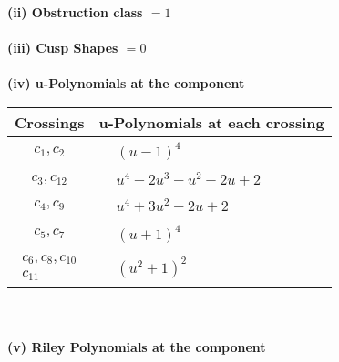 \documentclass[1p]{elsarticle_modified}
\theoremstyle{definition}
\begin{document}
\flushleft \textbf{(ii) Obstruction class $= 1$}\\~\\
\flushleft \textbf{(iii) Cusp Shapes $= 0$}\\~\\
\newpage\renewcommand{\arraystretch}{1}
\flushleft \textbf{(iv) u-Polynomials at the component}\newline \\
\begin{tabular}{m{50pt}|m{274pt}}
Crossings & \hspace{64pt}u-Polynomials at each crossing \\
\hline $$\begin{aligned}c_{1},c_{2}\end{aligned}$$&$\begin{aligned}
&(u-1)^4
\end{aligned}$\\
\hline $$\begin{aligned}c_{3},c_{12}\end{aligned}$$&$\begin{aligned}
&u^4-2 u^3- u^2+2 u+2
\end{aligned}$\\
\hline $$\begin{aligned}c_{4},c_{9}\end{aligned}$$&$\begin{aligned}
&u^4+3 u^2-2 u+2
\end{aligned}$\\
\hline $$\begin{aligned}c_{5},c_{7}\end{aligned}$$&$\begin{aligned}
&(u+1)^4
\end{aligned}$\\
\hline $$\begin{aligned}c_{6},c_{8},c_{10}\\c_{11}\end{aligned}$$&$\begin{aligned}
&(u^2+1)^2
\end{aligned}$\\
\hline
\end{tabular}\\~\\
\newpage\renewcommand{\arraystretch}{1}
\flushleft \textbf{(v) Riley Polynomials at the component}\newline \\
\end{document}
